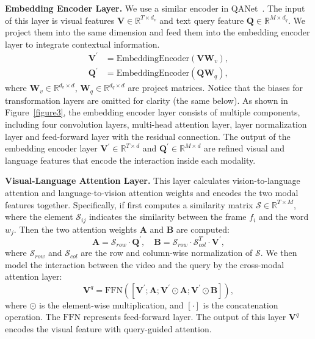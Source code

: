\documentclass[letterpaper]{article} %
\begin{document}
\noindent\textbf{Embedding Encoder Layer.}
We use a similar encoder in QANet~\cite{DBLP:conf/iclr/YuDLZ00L18}. 
The input of this layer is visual features $\bm{V} \in \mathbb{R}^{T\times d_{v}}$ and text query feature $\bm{Q}\in\mathbb{R}^{M\times d_{q}}$. 
We project them into the same dimension and feed them into the embedding encoder layer to integrate contextual information.
\begin{equation} \label{equation1}
\begin{split}
\bm{V}^{'} & =\text{EmbeddingEncoder}(\bm{V}\bm{W}_{v}), \\
\bm{Q}^{'} & =\text{EmbeddingEncoder}(\bm{Q}\bm{W}_{q}),
\end{split}
\end{equation}
where $\bm{W}_{v}\in\mathbb{R}^{d_{v}\times d}$, $\bm{W}_{q}\in\mathbb{R}^{d_{q}\times d}$ are project matrices. 
Notice that the biases for transformation layers are omitted for clarity (the same below). 
As shown in Figure~\ref{figure3}, the embedding encoder layer consists of multiple components, 
including four convolution layers, multi-head attention layer, layer normalization layer and feed-forward layer with the residual connection.
The output of the embedding encoder layer $\bm{V}^{'} \in \mathbb{R}^{T\times d}$ and $\bm{Q}^{'}\in\mathbb{R}^{M\times d}$ are refined visual and language features that encode the interaction inside each modality.

\noindent\textbf{Visual-Language Attention Layer.}
This layer calculates vision-to-language attention and language-to-vision attention weights and encodes the two modal features together. 
Specifically, if first computes a similarity matrix $\mathcal{S}\in\mathbb{R}^{T\times M}$, where the element $\mathcal{S}_{ij}$ 
indicates the similarity between the frame $f_{i}$ and the word $w_{j}$. 
Then the two attention weights $\bm{A}$ and $\bm{B}$ are computed:
\begin{equation}
\bm{A} = \mathcal{S}_{row}\cdot\bm{Q}^{'}, \quad \bm{B} = \mathcal{S}_{row}\cdot\mathcal{S}_{col}^{T}\cdot\bm{V}^{'},
\label{equation2}
\end{equation}
where $\mathcal{S}_{row}$ and $\mathcal{S}_{col}$ are the row and column-wise normalization of $\mathcal{S}$.
We then model the interaction between the video and the query by the cross-modal attention layer:
\begin{equation}
\bm{V}^{q}=\text{FFN}([\bm{V}^{'};\bm{A};\bm{V}^{'}\odot\bm{A};\bm{V}^{'}\odot\bm{B}]),
\label{equation3}
\end{equation}
where $\odot$ is the element-wise multiplication, and $[\cdot]$ is the concatenation operation. The $\text{FFN}$ represents feed-forward layer. The output of this layer $\bm{V}^{q}$ encodes the visual feature with query-guided attention.
\end{document}
